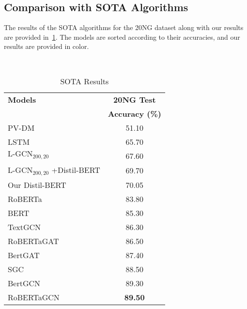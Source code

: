 \subsection{Comparison with SOTA Algorithms}\label{results:sota}
The results of the SOTA algorithms for the 20NG dataset along with our results are provided in~\cref{tab:results:sota}. The models are sorted according to their accuracies, and our results are provided in \textcolor{\resultcolor}{color}.
\begin{table}[h]
    \centering{}
    \caption{SOTA Results}~\label{tab:results:sota}
    \begin{tabular}{lc}\toprule
    \textbf{Models}   & \textbf{20NG Test}  \\
        & \textbf{Accuracy (\%)} \\ \midrule
    PV-DM           & 51.10        \\
    LSTM            & 65.70        \\
    \textcolor{\resultcolor}{$\text{L-GCN}_{200,20}$} & \textcolor{\resultcolor}{67.60} \\
    \textcolor{\resultcolor}{$\text{L-GCN}_{200,20}$ +Distil-BERT} & \textcolor{\resultcolor}{69.70} \\ 
    \textcolor{\resultcolor}{Our Distil-BERT} & \textcolor{\resultcolor}{70.05} \\
    RoBERTa         & 83.80        \\
    BERT            & 85.30        \\
    TextGCN         & 86.30        \\
    RoBERTaGAT      & 86.50        \\
    BertGAT         & 87.40        \\
    SGC             & 88.50        \\ 
    BertGCN         & 89.30        \\
    RoBERTaGCN      & \textbf{89.50} \\
       \bottomrule
    \end{tabular}
\end{table}

